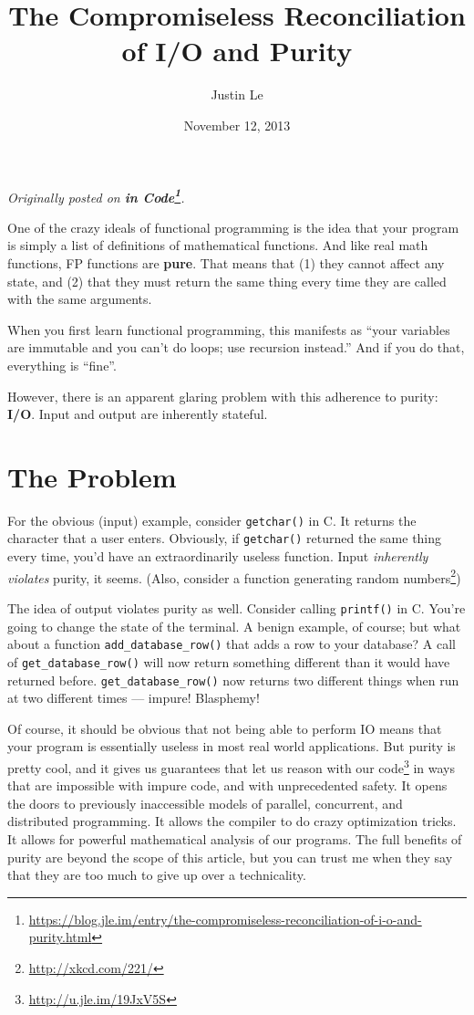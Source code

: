 \documentclass[]{article}
\title{The Compromiseless Reconciliation of I/O and Purity}
\author{Justin Le}
\date{November 12, 2013}
\renewcommand{\href}[2]{#2\footnote{\url{#1}}}
\begin{document}
\maketitle

\emph{Originally posted on
\textbf{\href{https://blog.jle.im/entry/the-compromiseless-reconciliation-of-i-o-and-purity.html}{in
Code}}.}

One of the crazy ideals of functional programming is the idea that your
program is simply a list of definitions of mathematical functions. And
like real math functions, FP functions are \textbf{pure}. That means
that (1) they cannot affect any state, and (2) that they must return the
same thing every time they are called with the same arguments.

When you first learn functional programming, this manifests as ``your
variables are immutable and you can't do loops; use recursion instead.''
And if you do that, everything is ``fine''.

However, there is an apparent glaring problem with this adherence to
purity: \textbf{I/O}. Input and output are inherently stateful.

\section{The Problem}\label{the-problem}

For the obvious (input) example, consider \texttt{getchar()} in C. It
returns the character that a user enters. Obviously, if
\texttt{getchar()} returned the same thing every time, you'd have an
extraordinarily useless function. Input \emph{inherently violates}
purity, it seems. (Also, consider a \href{http://xkcd.com/221/}{function
generating random numbers})

The idea of output violates purity as well. Consider calling
\texttt{printf()} in C. You're going to change the state of the
terminal. A benign example, of course; but what about a function
\texttt{add\_database\_row()} that adds a row to your database? A call
of \texttt{get\_database\_row()} will now return something different
than it would have returned before. \texttt{get\_database\_row()} now
returns two different things when run at two different times --- impure!
Blasphemy!

Of course, it should be obvious that not being able to perform IO means
that your program is essentially useless in most real world
applications. But purity is pretty cool, and it gives us guarantees that
let us \href{http://u.jle.im/19JxV5S}{reason with our code} in ways that
are impossible with impure code, and with unprecedented safety. It opens
the doors to previously inaccessible models of parallel, concurrent, and
distributed programming. It allows the compiler to do crazy optimization
tricks. It allows for powerful mathematical analysis of our programs.
The full benefits of purity are beyond the scope of this article, but
you can trust me when they say that they are too much to give up over a
technicality.
\end{document}
